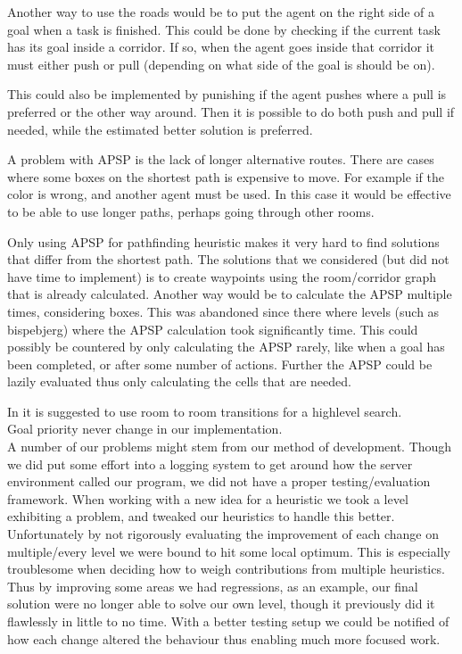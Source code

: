 \documentclass[letterpaper]{article}
\begin{document}
Another way to use the roads would be to put the agent on the right side of
a goal when a task is finished. This could be done by checking if the current task
has its goal inside a corridor. If so, when the agent goes inside that corridor
it must either push or pull (depending on what side of the goal is should be on).

This could also be implemented by punishing if the agent pushes where a pull is
preferred or the other way around. Then it is possible to do both push and pull
if needed, while the estimated better solution is preferred.

A problem with APSP is the lack of longer alternative routes. There are cases
where some boxes on the shortest path is expensive to move. For example if
the color is wrong, and another agent must be used. In this case it would be
effective to be able to use longer paths, perhaps going through other rooms.

Only using APSP for pathfinding heuristic makes it very hard to find solutions
that differ from the shortest path. The solutions that we considered (but did not
have time to implement) is to create waypoints using the room/corridor graph
that is already calculated. Another way would be to calculate the APSP multiple
times, considering boxes. This was abandoned since there where levels (such as bispebjerg)
where the APSP calculation took significantly time. This could possibly be countered
by only calculating the APSP rarely, like when a goal has been completed, or
after some number of actions. Further the APSP could be lazily evaluated thus
only calculating the cells that are needed.

In \cite{sokobanMA} it is suggested to use room to room transitions for
a highlevel search.\\

Goal priority never change in our implementation.\\

A number of our problems might stem from our method of development.
Though we did put some effort into a logging system to get around how the server
environment called our program, we did not have a proper testing/evaluation
framework.
When working with a new idea for a heuristic we took a level exhibiting a
problem, and tweaked our heuristics to handle this better.
Unfortunately by not rigorously evaluating the improvement of each change on
multiple/every level we were bound to hit some local optimum. This is especially
troublesome when deciding how to weigh contributions from multiple heuristics.
Thus by improving some areas we had regressions, as an example, our final
solution were no longer able to solve our own level, though it previously did it
flawlessly in little to no time. With a better testing setup we could be notified of how
each change altered the behaviour thus enabling much more focused work.
\end{document}
